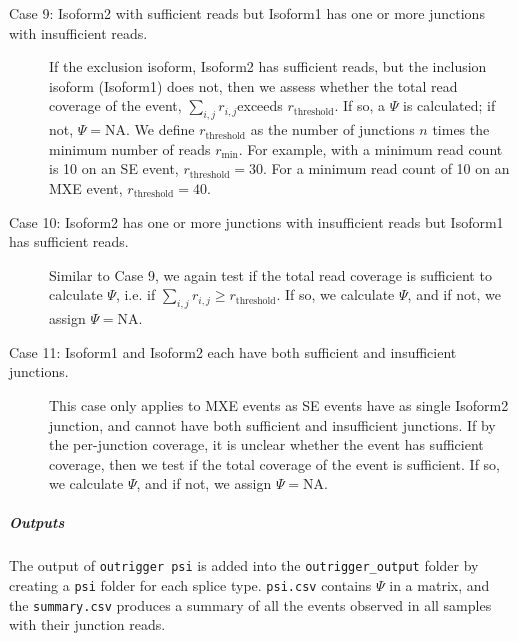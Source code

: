\begin{description}
	\item[Case 9: Isoform2 with sufficient reads but Isoform1 has one or more junctions with insufficient reads.] If the exclusion isoform, Isoform2 has sufficient reads, but the inclusion isoform (Isoform1) does not, then we assess whether the total read coverage of the event, $\sum_{i,j} r_{i,j}$exceeds $r_{\text{threshold}}$. If so, a $\Psi$ is calculated; if not, $\Psi = \text{NA}$. We define $r_{\text{threshold}}$ as the number of junctions $n$ times the minimum number of reads $r_{\min}$. For example, with a minimum read count is 10 on an SE event, $r_{\text{threshold}} = 30$. For a minimum read count of 10 on an MXE event, $r_{\text{threshold}} = 40$.
	\item[Case 10: Isoform2 has one or more junctions with insufficient reads but Isoform1 has sufficient reads.] Similar to Case 9, we again test if the total read coverage is sufficient to calculate $\Psi$, i.e. if $\sum_{i,j} r_{i,j} \geq r_{\text{threshold}}$. If so, we calculate $\Psi$, and if not, we assign $\Psi = \text{NA}$.
	\item[Case 11: Isoform1 and Isoform2 each have both sufficient and insufficient junctions.] This case only applies to MXE events as SE events have as single Isoform2 junction, and cannot have both sufficient and insufficient junctions. If by the per-junction coverage, it is unclear whether the event has sufficient coverage, then we test if the total coverage of the event is sufficient. If so, we calculate $\Psi$, and if not, we assign $\Psi = \text{NA}$.
\end{description}


\subparagraph{Outputs} The output of \texttt{outrigger psi} is added into the \texttt{outrigger\_output} folder by creating a \texttt{psi} folder for each splice type. \texttt{psi.csv} contains $\Psi$ in a matrix, and the \texttt{summary.csv} produces a summary of all the events observed in all samples with their junction reads.

